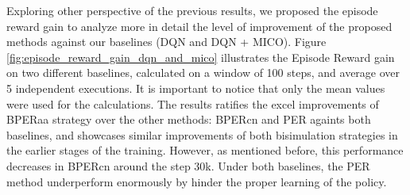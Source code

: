 Exploring other perspective of the previous results, we proposed the episode reward gain to analyze more in detail the level of improvement of the proposed methods against our baselines (DQN and DQN + MICO). Figure \ref{fig:episode_reward_gain_dqn_and_mico} illustrates the Episode Reward gain on two different baselines, calculated on a window of 100 steps, and average over 5 independent executions. It is important to notice that only the mean values were used for the calculations. The results ratifies the excel improvements of BPERaa strategy over the other methods: BPERcn and PER againts both baselines, and showcases similar improvements of both bisimulation strategies in the earlier stages of the training. However, as mentioned before, this performance decreases in BPERcn around the step 30k. Under both baselines, the PER method underperform enormously by hinder the proper learning of the policy.

